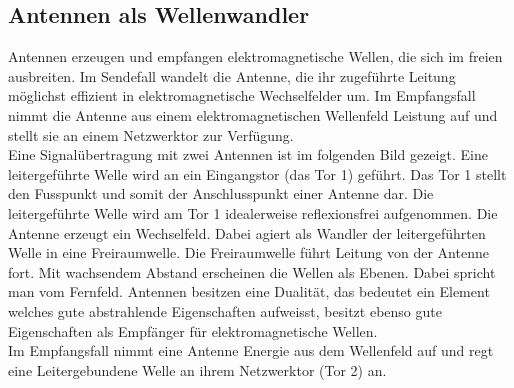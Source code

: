 \subsection{ Antennen als Wellenwandler}
Antennen erzeugen und empfangen elektromagnetische Wellen, die sich im freien ausbreiten. Im Sendefall wandelt die Antenne, die ihr zugeführte Leitung möglichst effizient in elektromagnetische Wechselfelder um. Im Empfangsfall nimmt die Antenne aus einem elektromagnetischen Wellenfeld Leistung auf und stellt sie an einem Netzwerktor zur Verfügung. \\
Eine Signalübertragung mit zwei Antennen ist im folgenden Bild gezeigt. Eine leitergeführte Welle wird an ein Eingangstor (das Tor 1) geführt. Das Tor 1 stellt den Fusspunkt und somit der Anschlusspunkt einer Antenne dar. Die leitergeführte Welle wird am Tor 1 idealerweise reflexionsfrei aufgenommen. Die Antenne erzeugt ein Wechselfeld. Dabei agiert als Wandler der leitergeführten Welle in eine Freiraumwelle. Die Freiraumwelle führt Leitung von der Antenne fort. Mit wachsendem Abstand erscheinen die Wellen als Ebenen. Dabei spricht man vom Fernfeld. Antennen besitzen eine Dualität, das bedeutet ein Element welches gute abstrahlende Eigenschaften aufweisst, besitzt ebenso gute Eigenschaften als Empfänger für elektromagnetische Wellen. \\
Im Empfangsfall nimmt eine Antenne Energie aus dem Wellenfeld auf und regt eine Leitergebundene Welle an ihrem Netzwerktor (Tor 2) an.
